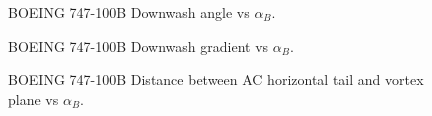 \begin{figure}[H]
\centering

\caption{BOEING 747-100B Downwash angle vs $\alpha_{B}$.}
\label{fig:epsilonboeing}
\end{figure}

\begin{figure}[H]
\centering

\caption{BOEING 747-100B  Downwash gradient vs $\alpha_{B}$.}
\label{fig:downwashgradboeing}
\end{figure}

\begin{figure}[H]
\centering

\caption{BOEING 747-100B  Distance between AC horizontal tail and vortex plane vs $\alpha_{B}$.}
\label{fig:zboeing}
\end{figure}


